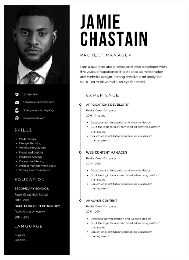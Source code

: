\documentclass[handout]{beamer}
\begin{document}
\begin{frame}
\begin{columns}
\begin{column}{.45\textwidth}
\begin{figure}
      \includegraphics[width=\columnwidth]{img/cv2.png}
    \end{figure}
  \end{column}
\end{columns}
\end{frame}
\end{document}
